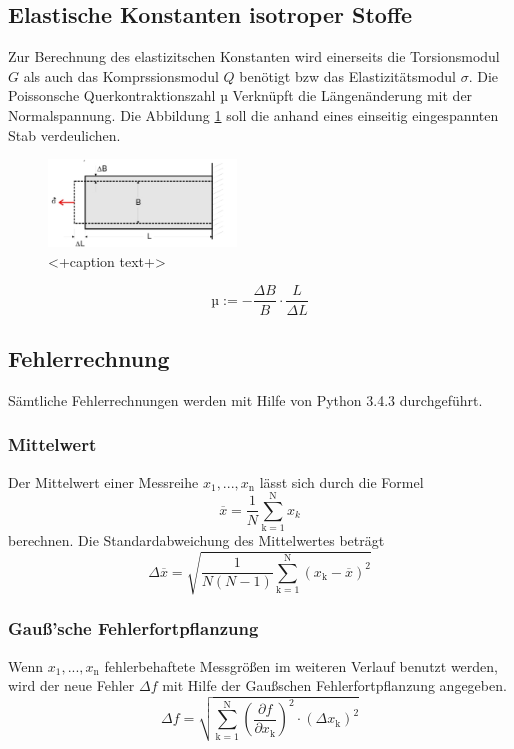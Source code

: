 \subsection{Elastische Konstanten isotroper Stoffe}
Zur Berechnung des elastizitschen Konstanten wird einerseits die Torsionsmodul $G$ als auch das Komprssionsmodul $Q$ benötigt bzw das Elastizitätsmodul $\sigma$.
Die Poissonsche Querkontraktionszahl µ Verknüpft die Längenänderung mit der Normalspannung. Die Abbildung \ref{fig:poisson} soll die anhand eines einseitig eingespannten Stab verdeulichen.
\begin{figure}
  \centering
  \includegraphics[width=5.0cm]{./picture/poisson.png}
  \caption{<+caption text+>}
  \label{fig:poisson}
\end{figure}
\begin{equation}
  µ := -\frac{\Delta B}{B} \cdot \frac{L}{\Delta L}
  \label{eqn:pois}
\end{equation}


\subsection{Fehlerrechnung}
Sämtliche Fehlerrechnungen werden mit Hilfe von Python 3.4.3 durchgeführt.
\subsubsection{Mittelwert}
Der Mittelwert einer Messreihe $x_\text{1}, ... ,x_\text{n}$ lässt sich durch die Formel
\begin{equation}
	\overline{x} = \frac{1}{N} \sum_{\text{k}=1}^\text{N} x_k
	\label{eqn:ave}
\end{equation}
berechnen. Die Standardabweichung des Mittelwertes beträgt
\begin{equation}
	\Delta \overline{x} = \sqrt{ \frac{1}{N(N-1)} \sum_{\text{k}=1}^\text{N} (x_\text{k} - \overline{x})^2}
	\label{eqn:std}
\end{equation}

\subsubsection{Gauß'sche Fehlerfortpflanzung}
Wenn $x_\text{1}, ..., x_\text{n}$ fehlerbehaftete Messgrößen im weiteren Verlauf benutzt werden, wird der neue Fehler $\Delta f$ mit Hilfe der Gaußschen Fehlerfortpflanzung angegeben.
\begin{equation}
	\Delta f = \sqrt{\sum_{\text{k}=1}^\text{N} \left( \frac{ \partial f}{\partial x_\text{k}} \right) ^2 \cdot (\Delta x_\text{k})^2}
	\label{eqn:var}
\end{equation}


